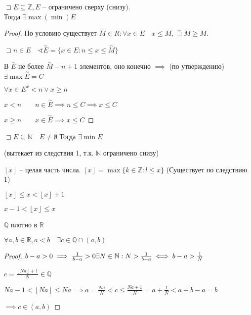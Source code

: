 \documentclass{book}
\newcommand\N{\ensuremath{\mathbb{N}}}
\newcommand\R{\ensuremath{\mathbb{R}}}
\newcommand\Z{\ensuremath{\mathbb{Z}}}
\renewcommand\O{\ensuremath{\emptyset}}
\newcommand\Q{\ensuremath{\mathbb{Q}}}
\theoremstyle{definition}
\begin{document}
    \begin{corollary}
        $\sqsupset E \subseteq \Z , E $ -- ограничено сверху (снизу). \\Тогда $\exists \max(\min) E$
    \end{corollary}
    \begin{proof}
        По условию существует $M\in R: \forall x\in E\quad x\leqslant M, \overset{\sim }\sqsupset M \geqslant M$.
        
        $\sqsupset n\in E\quad \sphericalangle \overset{\sim }E = \{x\in E: n\leqslant x\leqslant \overset{\sim }M\}$

        В $\overset{\sim }E$ не более $\overset{\sim }M - n+1$ элементов, оно конечно $\implies $ (по утверждению) $\exists \max \overset{\sim }E = C$

        $\forall x\in E^ x<n\vee x\geqslant n\qquad$

        $x<n\qquad n\in \overset{\sim }E \implies n\leqslant C \implies x\leqslant C$

        $x\geqslant n\qquad x\in \overset{\sim }E \implies x\leqslant C$
    \end{proof}
    \begin{corollary}
        $\sqsupset E\subseteq \N \quad E\neq \O $ Тогда $\exists \min E$

        (вытекает из следствия 1, т.к. $\N $ ограничено снизу)
    \end{corollary}

    $\left\lfloor x \right\rfloor$ -- целая часть числа. $\left\lfloor x \right\rfloor = \max\{k\in \Z :l\leqslant x\}$ (Существует по следствию 1)

    $\left\lfloor x \right\rfloor\leqslant x< \left\lfloor x \right\rfloor +1    $

    $x-1< \left\lfloor x \right\rfloor \leqslant x$

    \begin{statement}
        $\Q$ плотно в $\R$

        $\forall a, b\in \R, a<b\quad \exists c\in \Q\cap (a,b)$
    \end{statement}
    \begin{proof}
        $b-a>0 \implies \frac{1}{b-a}>0\quad\newline \exists N\in \N: N>\frac{1}{b-a} \iff  b-a>\frac{1}{N}$
        
        $c = \frac{\left\lfloor Na \right\rfloor+1}{N} \in \Q$

        $Na-1<\left\lfloor Na \right\rfloor\leqslant Na \implies  a = \frac{Na}{N}<c\leqslant \frac{Na+1}{N} = a + \frac{1}{N}<a+b-a = b$

        $\implies c\in (a,b)$


    \end{proof}
\end{document}
